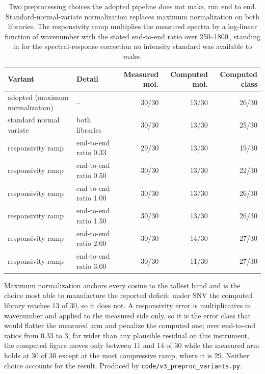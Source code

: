 \begin{table}[htbp]
\centering
\caption{Two preprocessing choices the adopted pipeline does not make, run end to end. Standard-normal-variate normalization replaces maximum normalization on both libraries. The responsivity ramp multiplies the measured spectra by a log-linear function of wavenumber with the stated end-to-end ratio over 250--1800\,\wn{}, standing in for the spectral-response correction no intensity standard was available to make.}
\label{tab:si-prepvar}
\small
\begin{tabular}{llrrr}
\toprule
Variant & Detail & Measured mol. & Computed mol. & Computed class \\
\midrule
adopted (maximum normalization) & -- & 30/30 & 13/30 & 26/30 \\
standard normal variate & both libraries & 30/30 & 13/30 & 25/30 \\
responsivity ramp & end-to-end ratio 0.33 & 29/30 & 13/30 & 19/30 \\
responsivity ramp & end-to-end ratio 0.50 & 30/30 & 13/30 & 22/30 \\
responsivity ramp & end-to-end ratio 1.00 & 30/30 & 13/30 & 26/30 \\
responsivity ramp & end-to-end ratio 1.50 & 30/30 & 13/30 & 26/30 \\
responsivity ramp & end-to-end ratio 2.00 & 30/30 & 14/30 & 27/30 \\
responsivity ramp & end-to-end ratio 3.00 & 30/30 & 11/30 & 27/30 \\
\bottomrule
\end{tabular}

\begin{flushleft}\footnotesize Maximum normalization anchors every cosine to the tallest band and is the choice most able to manufacture the reported deficit; under SNV the computed library reaches 13 of 30, so it does not. A responsivity error is multiplicative in wavenumber and applied to the measured side only, so it is the error class that would flatter the measured arm and penalize the computed one; over end-to-end ratios from 0.33 to 3, far wider than any plausible residual on this instrument, the computed figure moves only between 11 and 14 of 30 while the measured arm holds at 30 of 30 except at the most compressive ramp, where it is 29. Neither choice accounts for the result. Produced by \texttt{code/v3\_preproc\_variants.py}.\end{flushleft}
\end{table}
